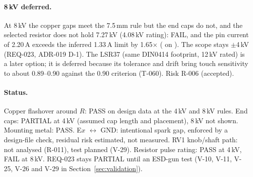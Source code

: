 \paragraph{8\,kV deferred.} At 8\,kV the copper gaps meet the 7.5\,mm rule but the
end caps do not, and the
selected resistor does not hold 7.27\,kV (4.08\,kV rating): FAIL, and the pin current
of 2.20\,A exceeds the inferred 1.33\,A limit by 1.65$\times$
( on ). The scope stays $\pm$4\,kV (REQ-023,
ADR-019 D-1). The LSR37 (same DIN0414 footprint, 12\,kV rated) is a later option;
it is deferred because its tolerance and drift bring touch sensitivity to about
0.89--0.90 against the 0.90 criterion (T-060). Risk R-006 (accepted).

\paragraph{Status.} Copper flashover around $R$: PASS on design data at the 4\,kV
and 8\,kV rules. End caps: PARTIAL at 4\,kV (assumed cap length and placement),
8\,kV not shown. Mounting metal: PASS. E$x$ $\leftrightarrow$ GND: intentional
spark gap, enforced by a design-file check, residual risk estimated, not measured.
RV1 knob/shaft path: not analysed (R-011), test planned (V-29). Resistor pulse rating: PASS at
4\,kV, FAIL at 8\,kV. REQ-023 stays PARTIAL until an ESD-gun test (V-10, V-11, V-25,
V-26 and V-29 in Section~\ref{sec:validation}).

